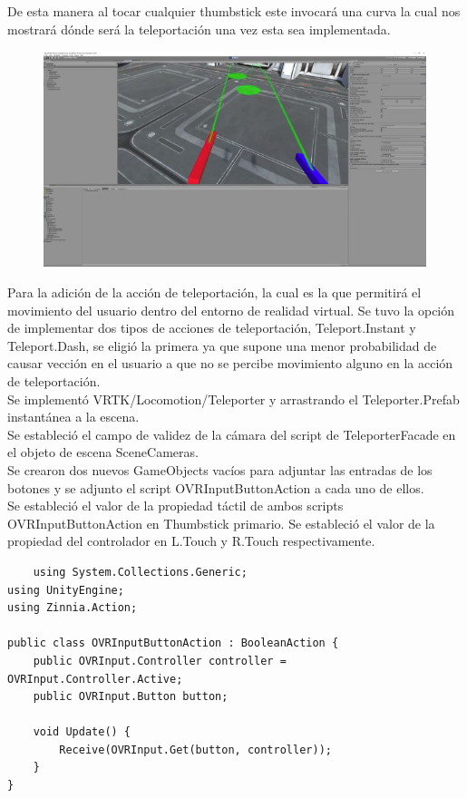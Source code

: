 De esta manera al tocar cualquier thumbstick este invocará una curva la cual nos mostrará dónde será la teleportación una vez esta sea implementada.\\
\begin{figure}[H]
	\begin{center}
 		\includegraphics[width = .5\textwidth]{source/images/image73.png}
	\end{center} 
\end{figure}

Para la adición de la acción de teleportación, la cual es la que permitirá el movimiento del usuario dentro del entorno de realidad virtual. Se tuvo la opción de 
implementar dos tipos de acciones de teleportación, Teleport.Instant y Teleport.Dash, se eligió la primera ya que supone una menor probabilidad de causar vección en el usuario 
 a que no se percibe movimiento alguno en la acción de teleportación.\\
Se implementó VRTK/Locomotion/Teleporter y arrastrando el Teleporter.Prefab instantánea a la escena.\\
Se estableció el campo de validez de la cámara del script de TeleporterFacade en el objeto de escena SceneCameras.\\
Se crearon dos nuevos GameObjects vacíos  para adjuntar las entradas de los botones y se adjunto el script OVRInputButtonAction a cada uno de ellos.\\
Se estableció el valor de la propiedad táctil de ambos scripts OVRInputButtonAction en Thumbstick primario. Se estableció el valor de la propiedad del controlador en 
L.Touch y R.Touch respectivamente.\\

\begin{verbatim}
    using System.Collections.Generic;
using UnityEngine;
using Zinnia.Action;
 
public class OVRInputButtonAction : BooleanAction {
    public OVRInput.Controller controller = OVRInput.Controller.Active;
    public OVRInput.Button button;
 
    void Update() {
        Receive(OVRInput.Get(button, controller));
    }
}
\end{verbatim}


